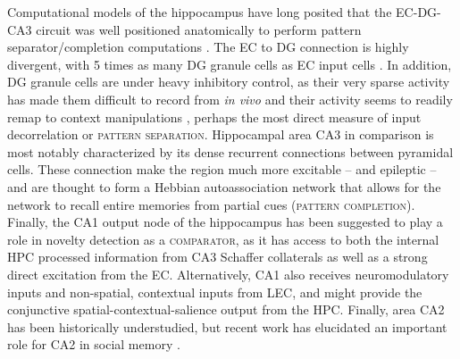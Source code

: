 Computational models of the hippocampus have long posited that the \ac{EC}-\ac{DG}-CA3 circuit was well positioned anatomically to perform pattern separator/completion computations \citep{Marr1971}.
The \ac{EC} to \ac{DG} connection is highly divergent, with 5 times as many \ac{DG} granule cells as \ac{EC} input cells \cite{Amaral1990}.
In addition, \ac{DG} granule cells are under heavy inhibitory control, as their very sparse activity has made them difficult to record from \emph{in vivo} and their activity seems to readily remap to context manipulations \citep{Neunuebel2014, Leutgeb2007}, perhaps the most direct measure of input decorrelation or \textsc{pattern separation}.
Hippocampal area CA3 in comparison is most notably characterized by its dense recurrent connections between pyramidal cells.
These connection make the region much more excitable -- and epileptic -- and are thought to form a Hebbian autoassociation network that allows for the network to recall entire memories from partial cues (\textsc{pattern completion}).
Finally, the CA1 output node of the hippocampus has been suggested to play a role in novelty detection as a \textsc{comparator}, as it has access to both the internal \ac{HPC} processed information from CA3 Schaffer collaterals as well as a strong direct excitation from the \ac{EC}.
Alternatively, CA1 also receives neuromodulatory inputs and non-spatial, contextual inputs from LEC, and might provide the conjunctive spatial-contextual-salience output from the \ac{HPC}. 
Finally, area CA2 has been historically understudied, but recent work has elucidated an important role for CA2 in social memory \citep{Hitti2014}.


